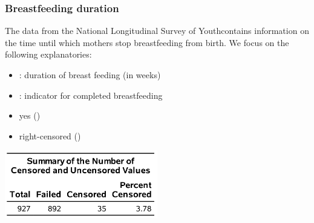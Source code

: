 \documentclass{beamer}
\begin{document}
\begin{frame}
\frametitle{Breastfeeding duration}
The  data from the National Longitudinal Survey of Youthcontains information on the time until which mothers stop breastfeeding from birth. We focus on the following explanatories:
\begin{itemize}
\item {}: duration of breast feeding (in weeks)
\item {}: indicator for completed breastfeeding 
\bi \item yes () 
\item right-censored ()
\ei

\end{itemize}
\begin{center}
\includegraphics[width = 0.5\textwidth]{img/c7/slides7e09}
\end{center}
% 
\end{frame}
\end{document}
